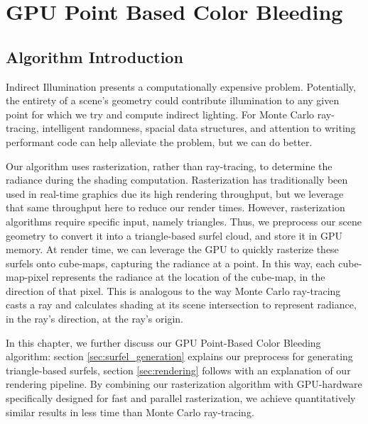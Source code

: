 \chapter{GPU Point Based Color Bleeding}

\section{Algorithm Introduction}

Indirect Illumination presents a computationally expensive problem. Potentially, the entirety of a scene's geometry could contribute illumination to any given point for which we try and compute indirect lighting. For Monte Carlo ray-tracing, intelligent randomness, spacial data structures, and attention to writing performant code can help alleviate the problem, but we can do better.

Our algorithm uses rasterization, rather than ray-tracing, to determine the radiance during the shading computation. Rasterization has traditionally been used in real-time graphics due its high rendering throughput, but we leverage that same throughput here to reduce our render times. However, rasterization algorithms require specific input, namely triangles. Thus, we preprocess our scene geometry to convert it into a triangle-based surfel cloud, and store it in GPU memory. At render time, we can leverage the GPU to quickly rasterize these surfels onto cube-maps, capturing the radiance at a point. In this way, each cube-map-pixel represents the radiance at the location of the cube-map, in the direction of that pixel. This is analogous to the way Monte Carlo ray-tracing casts a ray and calculates shading at its scene intersection to represent radiance, in the ray's direction, at the ray's origin.

In this chapter, we further discuss our GPU Point-Based Color Bleeding algorithm: section \ref{sec:surfel_generation} explains our preprocess for generating triangle-based surfels, section \ref{sec:rendering} follows with an explanation of our rendering pipeline. By combining our rasterization algorithm with GPU-hardware specifically designed for fast and parallel rasterization, we achieve quantitatively similar results in less time than Monte Carlo ray-tracing.

